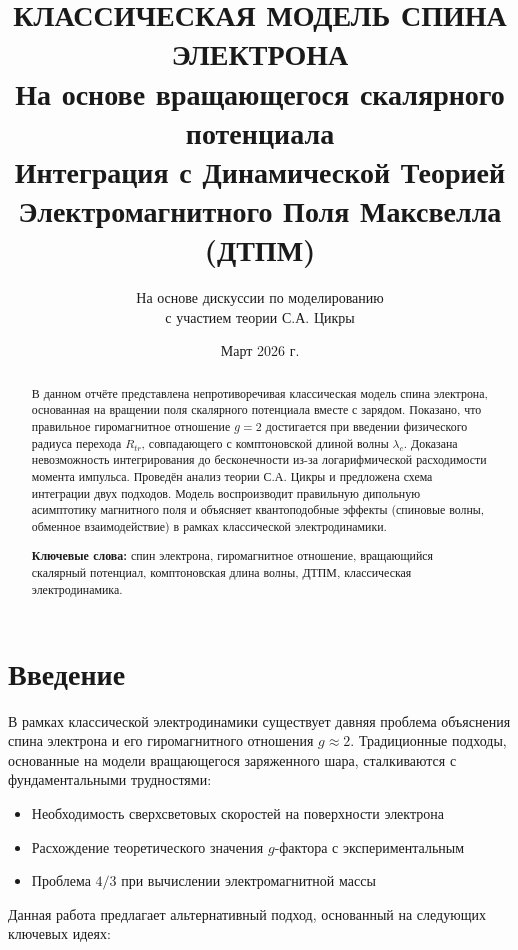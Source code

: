 \documentclass[12pt,a4paper]{article}
\title{\textbf{КЛАССИЧЕСКАЯ МОДЕЛЬ СПИНА ЭЛЕКТРОНА}\\[0.5cm]
\large На основе вращающегося скалярного потенциала\\[0.3cm]
\normalsize Интеграция с Динамической Теорией Электромагнитного Поля Максвелла (ДТПМ)}
\author{На основе дискуссии по моделированию\\
с участием теории С.А. Цикры}
\date{Март 2026 г.}
\begin{document}
\maketitle

\begin{abstract}
\noindent В данном отчёте представлена непротиворечивая классическая модель спина электрона, основанная на вращении поля скалярного потенциала вместе с зарядом. Показано, что правильное гиромагнитное отношение $g=2$ достигается при введении физического радиуса перехода $R_{tr}$, совпадающего с комптоновской длиной волны $\lambda_c$. Доказана невозможность интегрирования до бесконечности из-за логарифмической расходимости момента импульса. Проведён анализ теории С.А. Цикры и предложена схема интеграции двух подходов. Модель воспроизводит правильную дипольную асимптотику магнитного поля и объясняет квантоподобные эффекты (спиновые волны, обменное взаимодействие) в рамках классической электродинамики.

\vspace{0.3cm}
\noindent\textbf{Ключевые слова:} спин электрона, гиромагнитное отношение, вращающийся скалярный потенциал, комптоновская длина волны, ДТПМ, классическая электродинамика.
\end{abstract}

\tableofcontents
\newpage

\section{Введение}

В рамках классической электродинамики существует давняя проблема объяснения спина электрона и его гиромагнитного отношения $g \approx 2$. Традиционные подходы, основанные на модели вращающегося заряженного шара, сталкиваются с фундаментальными трудностями:

\begin{itemize}
    \item Необходимость сверхсветовых скоростей на поверхности электрона
    \item Расхождение теоретического значения $g$-фактора с экспериментальным
    \item Проблема $4/3$ при вычислении электромагнитной массы
\end{itemize}

Данная работа предлагает альтернативный подход, основанный на следующих ключевых идеях:
\end{document}
